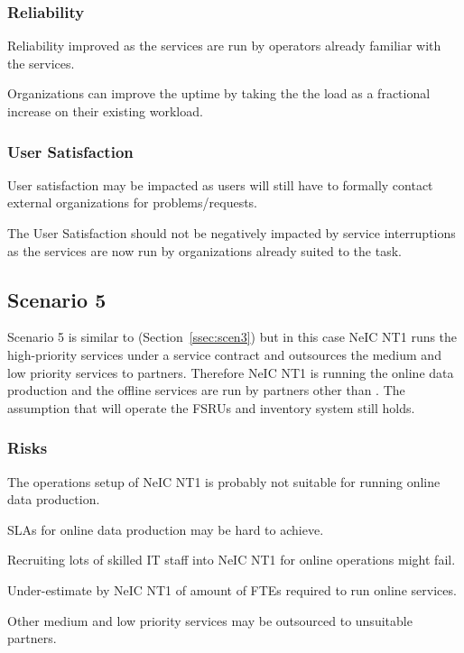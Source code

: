 \documentclass[12pt,a4paper]{article}
\newcommand{\nnt}{NeIC NT1\xspace}
\begin{document}
\subsubsection*{Reliability}
\bitm
\item Reliability improved as the services are run by operators already familiar with the services.
\item Organizations can improve the uptime by taking the the \ED load as a fractional increase on their existing workload.
\eitm

\subsubsection*{User Satisfaction}
\bitm
\item User satisfaction may be impacted as \EC users will still have to formally contact external organizations for problems/requests.
\item The User Satisfaction should not be negatively impacted by service interruptions as the services are now
  run by organizations already suited to the task.
\eitm
  
\subsection{Scenario 5}
\label{ssec:scen5}

Scenario 5 is similar to (Section~\ref{ssec:scen3}) but in this case \nnt runs the high-priority services under a
service contract and \EC outsources the medium and low priority services to partners.
Therefore NeIC NT1 is running the online data production and the offline services are run by partners other than \EC.
The assumption that \EC will operate the FSRUs and inventory system still holds.

\subsubsection*{Risks}
\bitm
  \item The operations setup of NeIC NT1 is probably not suitable for running online data production.
  \item SLAs for online data production may be hard to achieve.
  \item Recruiting lots of skilled IT staff into \nnt for online operations might fail.
  \item Under-estimate by \nnt of amount of FTEs required to run online services.
  \item Other medium and low priority services may be outsourced to unsuitable partners.
\eitm
\end{document}

